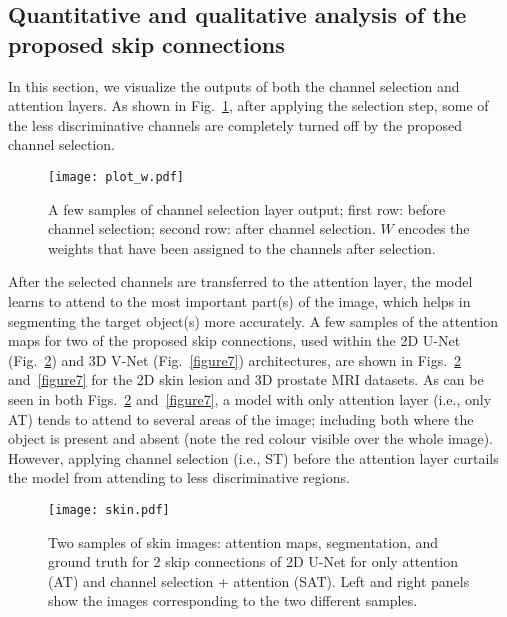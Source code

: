 \documentclass{article}
\begin{document}
\subsection{Quantitative and qualitative analysis of the proposed skip connections}

In this section, we visualize the outputs of both the channel selection and attention layers. As shown in Fig.~\ref{figure5}, after applying the selection step, some of the less discriminative channels are completely turned off by the proposed channel selection.

\begin{figure}
\centering
\texttt{[image: plot\_w.pdf]}
\caption{A few samples of channel selection layer output; first row: before channel selection; second row: after channel selection. $W$ encodes the weights that have been assigned to the channels after selection.}
\label{figure5}
\end{figure}

After the selected channels are transferred to the attention layer, the model learns to attend to the most important part(s) of the image, which helps in segmenting the target object(s) more accurately. A few samples of the attention maps for two of the proposed skip connections, used within the 2D U-Net (Fig.~\ref{figure6}) and 3D V-Net (Fig.~\ref{figure7}) architectures, are shown in Figs.~\ref{figure6} and~\ref{figure7} for the 2D skin lesion and 3D prostate MRI datasets. As can be seen in both Figs.~\ref{figure6} and~\ref{figure7}, a model with only attention layer (i.e., only AT) tends to attend to several areas of the image; including both where the object is present and absent (note the red colour visible over the whole image). However, applying channel selection (i.e., ST) before the attention layer curtails the model from attending to less discriminative regions.


\begin{figure}
\centering
\texttt{[image: skin.pdf]}
\caption{Two samples of skin images: attention maps, segmentation, and ground truth for 2 skip connections of 2D U-Net for only attention (AT) and channel selection + attention (SAT). Left and right panels show the images corresponding to the two different samples.}
\label{figure6}
\end{figure}
\end{document}

